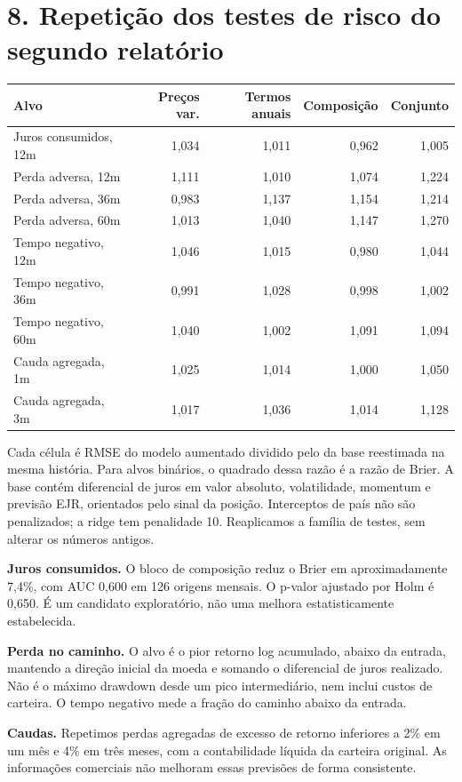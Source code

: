 \documentclass[11pt,a4paper]{article}
\begin{document}
\section*{8. Repetição dos testes de risco do segundo relatório}
\small\begin{center}\begin{tabular}{lrrrr}\toprule Alvo & Preços var. & Termos anuais & Composição & Conjunto\\\midrule 
Juros consumidos, 12m & 1,034 & 1,011 & 0,962 & 1,005\\
Perda adversa, 12m & 1,111 & 1,010 & 1,074 & 1,224\\
Perda adversa, 36m & 0,983 & 1,137 & 1,154 & 1,214\\
Perda adversa, 60m & 1,013 & 1,040 & 1,147 & 1,270\\
Tempo negativo, 12m & 1,046 & 1,015 & 0,980 & 1,044\\
Tempo negativo, 36m & 0,991 & 1,028 & 0,998 & 1,002\\
Tempo negativo, 60m & 1,040 & 1,002 & 1,091 & 1,094\\
Cauda agregada, 1m & 1,025 & 1,014 & 1,000 & 1,050\\
Cauda agregada, 3m & 1,017 & 1,036 & 1,014 & 1,128\\\bottomrule\end{tabular}\end{center}\normalsize

Cada célula é RMSE do modelo aumentado dividido pelo da base reestimada na mesma história. Para alvos binários, o quadrado dessa razão é a razão de Brier. A base contém diferencial de juros em valor absoluto, volatilidade, momentum e previsão EJR, orientados pelo sinal da posição. Interceptos de país não são penalizados; a ridge tem penalidade 10. Reaplicamos a família de testes, sem alterar os números antigos.

\textbf{Juros consumidos.} O bloco de composição reduz o Brier em aproximadamente 7,4\%, com AUC 0,600 em 126 origens mensais. O p-valor ajustado por Holm é 0,650. É um candidato exploratório, não uma melhora estatisticamente estabelecida.

\textbf{Perda no caminho.} O alvo é o pior retorno log acumulado, abaixo da entrada, mantendo a direção inicial da moeda e somando o diferencial de juros realizado. Não é o máximo drawdown desde um pico intermediário, nem inclui custos de carteira. O tempo negativo mede a fração do caminho abaixo da entrada.

\textbf{Caudas.} Repetimos perdas agregadas de excesso de retorno inferiores a 2\% em um mês e 4\% em três meses, com a contabilidade líquida da carteira original. As informações comerciais não melhoram essas previsões de forma consistente.
\end{document}
